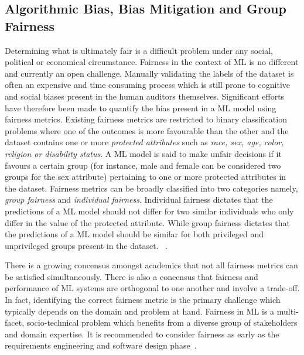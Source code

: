 \documentclass{article}
\begin{document}



\subsection{Algorithmic Bias, Bias Mitigation and Group Fairness}\label{sec:bias-fairness}

Determining what is ultimately fair is a difficult problem under any
social, political or economical circumstance. Fairness in the context
of ML is no different and currently an open challenge. Manually
validating the labels of the dataset is often an expensive and time
consuming process which is still prone to cognitive and social biases
present in the human auditors themselves. Significant efforts have
therefore been made to quantify the bias present in a ML model using
fairness metrics. Existing fairness metrics are restricted to binary
classification problems where one of the outcomes is more favourable
than the other and the dataset contains one or more \emph{protected
attributes} such as \emph{race, sex, age, color, religion or
disability status}. A ML model is said to make unfair decisions if it
favours a certain group (for instance, male and female can be
considered two groups for the sex attribute) pertaining to one or more
protected attributes in the dataset. Fairness metrics can be broadly
classified into two categories namely, \emph{group fairness} and
\emph{individual fairness}. Individual fairness dictates that the
predictions of a ML model should not differ for two similar
individuals who only differ in the value of the protected
attribute. While group fairness dictates that the predictions of a ML
model should be similar for both privileged and unprivileged groups
present in the
dataset.  \cite{castelnovo2022clarification,hellman2020measuring,mitchell2021algorithmic,kusner2017counterfactual,grgic2016case,dwork2012fairness,barocas2019fairness,barocas2016big,hardt2016equality,binns2018fairness,hutchinson201950,verma2018fairness,saxena2019fairness}.

There is a growing concensus amongst academics that not all fairness
metrics can be satisfied simultaneously. There is also a concensus
that fairness and performance of ML systems are orthogonal to one
another and involve a trade-off. In fact, identifying the correct
fairness metric is the primary challenge which typically depends on
the domain and problem at hand. Fairness in ML is a multi-facet,
socio-technical problem which benefits from a diverse group of
stakeholders and domain expertise. It is recommended to consider
fairness as early as the requirements engineering and software design
phase \cite{zhang2020machine,chen2022fairness,mehrabi2021survey,zhang2021ignorance}.
\end{document}
